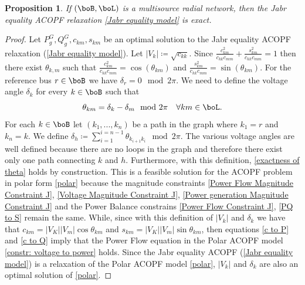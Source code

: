 \documentclass[11pt,a4paper,oneside,openany]{book}
\newtheorem{prop}[theorem]{Proposition}
\numberwithin{definition}{section}
\numberwithin{theorem}{section}
\numberwithin{problem}{section}
\begin{document}
\begin{prop}
\label{Jabr equality model exactness}
    If $(\boB,\boL)$ is a multisource radial network, then the Jabr equality ACOPF relaxation \eqref{Jabr equality model} is exact. 
\end{prop}

\begin{proof}
Let $P_g^G,Q_g^G, c_{km}, s_{km}$ be an optimal solution to the Jabr equality ACOPF relaxation (\ref{Jabr equality model}). Let $|V_k| \coloneqq \sqrt{c_{kk}}$. Since $\frac{c_{km}^2}{c_{kk}c_{mm}}+\frac{s_{km}^2}{c_{kk}c_{mm}} = 1$  then there exist $\theta_{k,m}$ such that $\frac{c_{km}^2}{c_{kk}c_{mm}} = \cos(\theta_{km})$ and $\frac{s_{km}^2}{c_{kk}c_{mm}} = \sin(\theta_{km})$. For the reference bus $r \in \boB$ we have $\delta_r = 0 \mod 2\pi$. We need to define the voltage angle $\delta_k$ for every $k \in \boB$ such that
\begin{equation} \label{exactness of theta}
    \theta_{km}=\delta_k - \delta_m\mod 2 \pi \quad  \forall km \in \boL .
\end{equation}
 For each $k \in \boB$ let $(k_1,...,k_n)$ be a path in the graph where $k_1 = r$ and $k_n = k$. We define $\delta_h \coloneqq  \sum_{i=1}^{i=n-1}\theta_{k_{i+1}k_{i}} \mod 2\pi$. The various voltage angles are well defined because there are no loops in the graph and therefore there exist only one path connecting $k$ and $h$. Furthermore, with this definition, \eqref{exactness of theta} holds by construction. This is a feasible solution for the ACOPF problem in polar form \eqref{polar} because the magnitude constraints \eqref{Power Flow Magnitude Constraint J}, \eqref{Voltage Magnitude Constraint J}, \eqref{Power generation Magnitude Constraint J} and the Power Balance constrains \eqref{Power Flow Constraint J}, \eqref{PQ to S} remain the same. While, since with this definition of $|V_k|$ and $\delta_k$ we have that $c_{km}= |V_K||V_m|\cos{\theta_{km}}$ and $s_{km}= |V_K||V_m|\sin{\theta_{km}}$, then equations \eqref{c to P} and \eqref{c to Q} imply that the Power Flow equation in the Polar ACOPF model \eqref{constr: voltage to power} holds.
 Since the Jabr equality ACOPF (\ref{Jabr equality model}) is a relaxation of the Polar ACOPF model \eqref{polar}, $|V_k|$ and $\delta_k$ are also an optimal solution of \eqref{polar}.
\end{proof}
\end{document}
